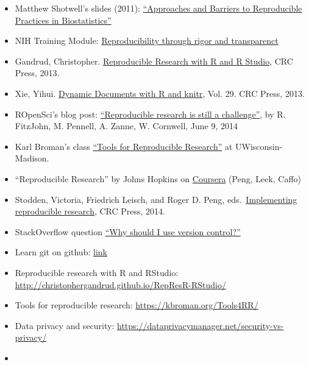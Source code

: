 \documentclass[
]{book}
\providecommand{\tightlist}{%
  \setlength{\itemsep}{0pt}\setlength{\parskip}{0pt}}
\begin{document}
\begin{itemize}
\tightlist
\item
  Matthew Shotwell's slides (2011): \href{https://rstudio-pubs-static.s3.amazonaws.com/177032_7be0bffdc2274d679c03b7228ac7b91f.html}{``Approaches and Barriers to Reproducible Practices in Biostatistics''}
\item
  NIH Training Module: \href{https://grants.nih.gov/reproducibility/module_1/presentation.html}{Reproducibility through rigor and transparenct}
\item
  Gandrud, Christopher. \href{https://englianhu.files.wordpress.com/2016/01/reproducible-research-with-r-and-studio-2nd-edition.pdf}{Reproducible Research with R and R Studio}, CRC Press, 2013.
\item
  Xie, Yihui. \href{http://static.latexstudio.net/wp-content/uploads/2014/03/DDR-Yihui-Xie-Chap1-3.pdf}{Dynamic Documents with R and knitr}, Vol. 29. CRC Press, 2013.
\item
  ROpenSci's blog post: \href{https://ropensci.org/blog/2014/06/09/reproducibility/}{``Reproducible research is still a challenge''}, by R. FitzJohn, M. Pennell, A. Zanne, W. Cornwell, June 9, 2014
\item
  Karl Broman's class \href{http://kbroman.org/Tools4RR/}{``Tools for Reproducible Research''} at UWisconsin-Madison.
\item
  ``Reproducible Research'' by Johns Hopkins on \href{https://www.coursera.org/learn/reproducible-research}{Coursera} (Peng, Leek, Caffo)
\item
  Stodden, Victoria, Friedrich Leisch, and Roger D. Peng, eds.~\href{https://www.jstatsoft.org/article/view/v061b02/v61b02.pdf}{Implementing reproducible research}, CRC Press, 2014.
\item
  StackOverflow question \href{https://stackoverflow.com/questions/1408450/why-should-i-use-version-control\#:~:text=Version\%20control\%20gives\%20you\%20the,using\%20tools.}{``Why should I use version control?''}
\item
  Learn git on github: \href{https://try.github.io/levels/1/challenges/1}{link}
\item
  Reproducible research with R and RStudio: \url{http://christophergandrud.github.io/RepResR-RStudio/}
\item
  Tools for reproducible research: \url{https://kbroman.org/Tools4RR/}
\item
  Data privacy and security: \url{https://dataprivacymanager.net/security-vs-privacy/}
\item

\end{itemize}
\end{document}
